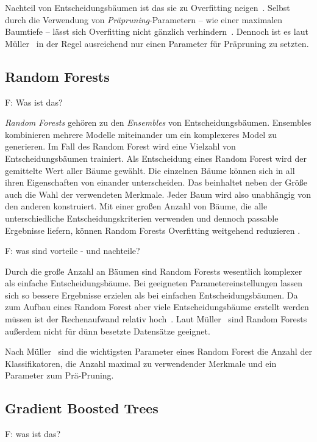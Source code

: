 Nachteil von Entscheidungsbäumen ist das sie zu Overfitting neigen~\cite[S.~80]{Muller.2017}. Selbst durch die Verwendung von \textit{Präpruning}-Parametern -- wie einer maximalen Baumtiefe -- lässt sich Overfitting nicht gänzlich verhindern~\cite[S.~80]{Muller.2017}. Dennoch ist es laut Müller~\cite[S.~79]{Muller.2017} in der Regel ausreichend nur einen Parameter für Präpruning zu setzten.
\subsection{Random Forests}
\label{sec:random_forest}
F: Was ist das?

\textit{Random Forests} gehören zu den \textit{Ensembles} von Entscheidungsbäumen. Ensembles kombinieren mehrere Modelle miteinander um ein komplexeres Model zu generieren. Im Fall des Random Forest wird eine Vielzahl von Entscheidungsbäumen trainiert. Als Entscheidung eines Random Forest wird der gemittelte Wert aller Bäume gewählt. Die einzelnen Bäume können sich in all ihren Eigenschaften von einander unterscheiden. Das beinhaltet neben der Größe auch die Wahl der verwendeten Merkmale. Jeder Baum wird also unabhängig von den anderen konstruiert. Mit einer großen Anzahl von Bäume, die alle unterschiedliche Entscheidungskriterien verwenden und dennoch passable Ergebnisse liefern, können Random Forests Overfitting weitgehend reduzieren \cite{Muller.2017}.

F: was sind vorteile - und nachteile?

Durch die große Anzahl an Bäumen sind Random Forests wesentlich komplexer als einfache Entscheidungsbäume. Bei geeigneten Parametereinstellungen lassen sich so bessere Ergebnisse erzielen als bei einfachen Entscheidungsbäumen. Da zum Aufbau eines Random Forest aber viele Entscheidungsbäume erstellt werden müssen ist der Rechenaufwand relativ hoch~\cite[S.~84]{Muller.2017}. Laut Müller~\cite[S.~85]{Muller.2017} sind Random Forests außerdem nicht für dünn besetzte Datensätze geeignet.

Nach Müller~\cite[S.~85]{Muller.2017} sind die wichtigsten Parameter eines Random Forest die Anzahl der Klassifikatoren, die Anzahl maximal zu verwendender Merkmale und ein Parameter zum Prä-Pruning.
\subsection{Gradient Boosted Trees}
\label{sec:gradient_boosted_trees}
F: was ist das?

